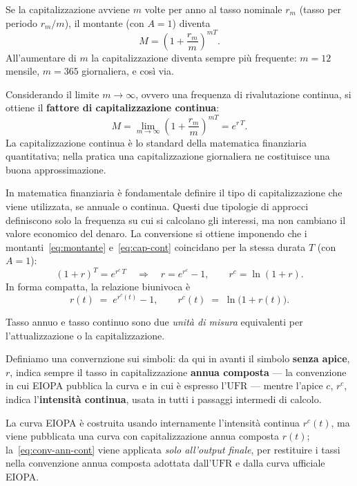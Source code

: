 \documentclass[11pt,a4paper]{article}
\theoremstyle{plain}
\theoremstyle{definition}
\theoremstyle{remark}
\newcommand{\UFR}{\mathrm{UFR}}
\begin{document}
Se la capitalizzazione avviene $m$ volte per anno al tasso nominale $r_m$ (tasso per
periodo $r_m/m$), il montante (con $A=1$) diventa
\[
  M = \left(1 + \frac{r_m}{m}\right)^{mT}.
\]
All'aumentare di $m$ la capitalizzazione diventa sempre pi\`u frequente: $m=12$ mensile,
$m=365$ giornaliera, e cos\`i via.

Considerando il limite ${m\to\infty}$, ovvero una frequenza di rivalutazione continua, si
ottiene il \textbf{fattore di capitalizzazione continua}:
\begin{equation}
  M = \lim_{m\to\infty}\left(1+\frac{r_m}{m}\right)^{mT} = e^{r\,T}.
  \label{eq:cap-cont}
\end{equation}
La capitalizzazione continua \`e lo standard della matematica finanziaria quantitativa; nella
pratica una capitalizzazione giornaliera ne costituisce una buona approssimazione.

In matematica finanziaria è fondamentale definire il tipo di capitalizzazione che viene utilizzata, 
se annuale o continua. Questi due tipologie di approcci definiscono solo la frequenza su cui si calcolano gli interessi, 
ma non cambiano il valore economico del denaro.  La conversione si ottiene imponendo che i montanti~\eqref{eq:montante}
e~\eqref{eq:cap-cont} coincidano per la stessa durata $T$ (con $A=1$):
\[
  (1+r)^T = e^{r^c\,T}
  \quad\Longrightarrow\quad
  r = e^{r^c} - 1,\qquad r^c = \ln(1+r).
\]
In forma compatta, la relazione biunivoca \`e
\begin{equation}
  r(t) \;=\; e^{r^c(t)} - 1,
  \qquad
  r^c(t) \;=\; \ln\!\bigl(1 + r(t)\bigr).
  \label{eq:conv-ann-cont}
\end{equation}

Tasso annuo e tasso continuo sono due \emph{unit\`a di misura} equivalenti per
l'attualizzazione o la capitalizzazione.

Definiamo una convernzione sui simboli: da qui in avanti il simbolo \textbf{senza apice}, $r$, indica sempre il tasso in
capitalizzazione \textbf{annua composta} --- la convenzione in cui EIOPA pubblica la curva e
in cui \`e espresso l'$\UFR$ --- mentre l'apice $c$, $r^c$, indica l'\textbf{intensit\`a
continua}, usata in tutti i passaggi intermedi di calcolo.


La curva EIOPA \`e costruita usando internamente l'intensit\`a continua $r^c(t)$, ma viene pubblicata una curva con capitalizzazione annua composta $r(t)$;
la~\eqref{eq:conv-ann-cont} viene applicata \emph{solo all'output finale}, per
restituire i tassi nella convenzione annua composta adottata dall'$\UFR$ e dalla curva
ufficiale EIOPA.
\end{document}

